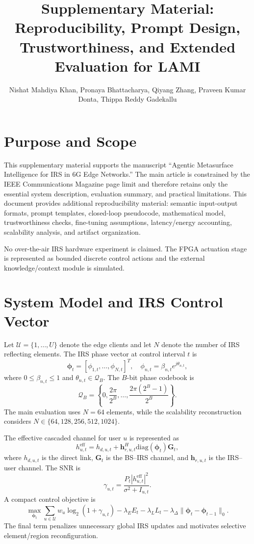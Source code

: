 \documentclass[11pt]{article}
\title{Supplementary Material: Reproducibility, Prompt Design, Trustworthiness, and Extended Evaluation for LAMI}
\author{Nishat Mahdiya Khan, Pronaya Bhattacharya, Qiyang Zhang, Praveen Kumar Donta, Thippa Reddy Gadekallu}
\date{}
\begin{document}
\maketitle

\section{Purpose and Scope}
This supplementary material supports the manuscript ``Agentic Metasurface Intelligence for IRS in 6G Edge Networks.'' The main article is constrained by the IEEE Communications Magazine page limit and therefore retains only the essential system description, evaluation summary, and practical limitations. This document provides additional reproducibility material: semantic input-output formats, prompt templates, closed-loop pseudocode, mathematical model, trustworthiness checks, fine-tuning assumptions, latency/energy accounting, scalability analysis, and artifact organization.

No over-the-air IRS hardware experiment is claimed. The FPGA actuation stage is represented as bounded discrete control actions and the external knowledge/context module is simulated.

\section{System Model and IRS Control Vector}
Let $\mathcal{U}=\{1,\ldots,U\}$ denote the edge clients and let $N$ denote the number of IRS reflecting elements. The IRS phase vector at control interval $t$ is
\begin{equation}
\boldsymbol{\phi}_{t}=[\phi_{1,t},\ldots,\phi_{N,t}]^{T},\quad
\phi_{n,t}=\beta_{n,t}e^{j\theta_{n,t}},
\end{equation}
where $0\leq\beta_{n,t}\leq1$ and $\theta_{n,t}\in\mathcal{Q}_{B}$. The $B$-bit phase codebook is
\begin{equation}
\mathcal{Q}_{B}=\left\{0,\frac{2\pi}{2^B},\ldots,\frac{2\pi(2^B-1)}{2^B}\right\}.
\end{equation}
The main evaluation uses $N=64$ elements, while the scalability reconstruction considers $N\in\{64,128,256,512,1024\}$.

The effective cascaded channel for user $u$ is represented as
\begin{equation}
h^{\mathrm{eff}}_{u,t}=h_{d,u,t}+\mathbf{h}^{H}_{r,u,t}\mathrm{diag}(\boldsymbol{\phi}_{t})\mathbf{G}_{t},
\end{equation}
where $h_{d,u,t}$ is the direct link, $\mathbf{G}_{t}$ is the BS--IRS channel, and $\mathbf{h}_{r,u,t}$ is the IRS--user channel. The SNR is
\begin{equation}
\gamma_{u,t}=\frac{P_t|h^{\mathrm{eff}}_{u,t}|^2}{\sigma^2+I_{u,t}}.
\end{equation}
A compact control objective is
\begin{equation}
\max_{\boldsymbol{\phi}_{t}}\sum_{u\in\mathcal{U}}w_u\log_2(1+\gamma_{u,t})-\lambda_EE_t-\lambda_LL_t-\lambda_{\Delta}\|\boldsymbol{\phi}_{t}-\boldsymbol{\phi}_{t-1}\|_0.
\end{equation}
The final term penalizes unnecessary global IRS updates and motivates selective element/region reconfiguration.
\end{document}
